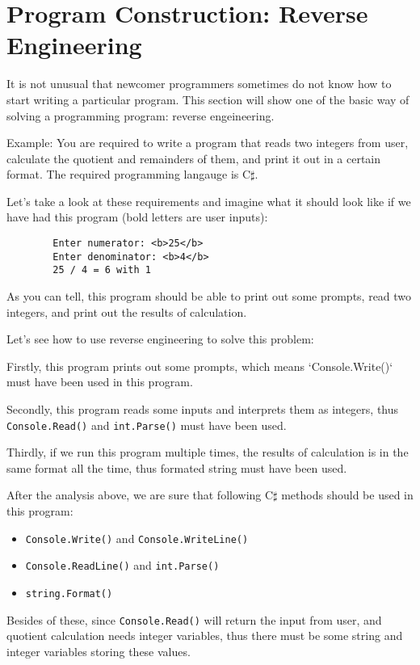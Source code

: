 \documentclass[../main.tex]{subfiles}
\begin{document}
    \section{Program Construction: Reverse Engineering}
    It is not unusual that newcomer programmers sometimes do not know how to
    start writing a particular program. This section will show one of the basic
    way of solving a programming program: reverse engeineering.

    Example: You are required to write a program that reads two integers from
    user, calculate the quotient and remainders of them, and print it out in a
    certain format. The required programming langauge is C$\sharp$.

    Let's take a look at these requirements and imagine what it should look like
    if we have had this program (bold letters are user inputs):

    \begin{verbatim}
        Enter numerator: <b>25</b>
        Enter denominator: <b>4</b>
        25 / 4 = 6 with 1
    \end{verbatim}

As you can tell, this program should be able to print out some prompts, read
two integers, and print out the results of calculation.

Let's see how to use reverse engineering to solve this problem:

Firstly, this program prints out some prompts, which means `Console.Write()`
must have been used in this program.

Secondly, this program reads some inputs and interprets them as integers, thus
\texttt{Console.Read()} and \texttt{int.Parse()} must have been used.

Thirdly, if we run this program multiple times, the results of calculation is
in the same format all the time, thus formated string must have been used.

After the analysis above, we are sure that following C$\sharp$ methods should be
used in this program:
\begin{itemize}
    \item \texttt{Console.Write()} and \texttt{Console.WriteLine()}
    \item \texttt{Console.ReadLine()} and \texttt{int.Parse()}
    \item \texttt{string.Format()}
\end{itemize}

Besides of these, since \texttt{Console.Read()} will return the input from user, and
quotient calculation needs integer variables, thus there must be some string and
integer variables storing these values.
\end{document}
